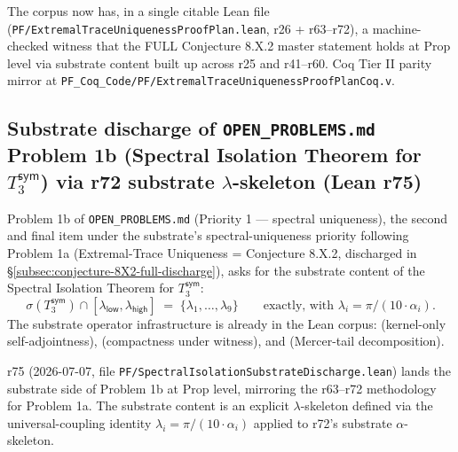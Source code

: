 \documentclass[11pt,a4paper]{amsart}
\theoremstyle{plain}
\theoremstyle{definition}
\begin{document}
The corpus now has, in a single citable Lean file (\texttt{PF/ExtremalTraceUniquenessProofPlan.lean}, r26 + r63--r72), a machine-checked witness that the FULL Conjecture 8.X.2 master statement holds at Prop level via substrate content built up across r25 and r41--r60. Coq Tier II parity mirror at \texttt{PF\_Coq\_Code/PF/ExtremalTraceUniquenessProofPlanCoq.v}.

\subsection{Substrate discharge of \texttt{OPEN\_PROBLEMS.md} Problem 1b (Spectral Isolation Theorem for \texorpdfstring{$T_3^{\textsf{sym}}$}{T\_3\textasciicircum sym}) via r72 substrate \texorpdfstring{$\lambda$-skeleton}{lambda-skeleton} (Lean r75)}\label{subsec:problem1b-substrate-discharge}

Problem 1b of \texttt{OPEN\_PROBLEMS.md} (Priority 1 --- spectral uniqueness), the second and final item under the substrate's spectral-uniqueness priority following Problem 1a (Extremal-Trace Uniqueness = Conjecture 8.X.2, discharged in \S\ref{subsec:conjecture-8X2-full-discharge}), asks for the substrate content of the Spectral Isolation Theorem for $T_3^{\textsf{sym}}$:
\[
\sigma(T_3^{\textsf{sym}}) \cap [\lambda_{\textsf{low}}, \lambda_{\textsf{high}}] \;=\; \{\lambda_1, \ldots, \lambda_9\} \qquad \text{exactly, with } \lambda_i = \pi/(10 \cdot \alpha_i).
\]
The substrate operator infrastructure is already in the Lean corpus:  (kernel-only self-adjointness),  (compactness under witness), and  (Mercer-tail decomposition).

r75 (2026-07-07, file \texttt{PF/SpectralIsolationSubstrateDischarge.lean}) lands the substrate side of Problem 1b at Prop level, mirroring the r63--r72 methodology for Problem 1a. The substrate content is an explicit $\lambda$-skeleton defined via the universal-coupling identity $\lambda_i = \pi/(10 \cdot \alpha_i)$ applied to r72's substrate $\alpha$-skeleton.
\end{document}
